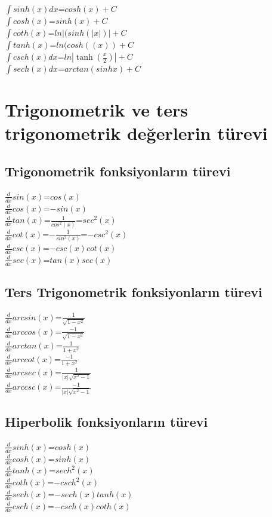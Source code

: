 \documentclass[10pt]{article}
\begin{document}
$\displaystyle \int sinh(x)dx$=$cosh(x)+C$\\
$\displaystyle \int cosh(x)$=$sinh(x)+C$\\
$\displaystyle \int coth(x)$=$ln|(sinh(|x|)|+C$\\
$\displaystyle \int tanh(x)$=$ln(cosh((x))+C$\\
$\displaystyle \int csch(x)dx$=$ln| \tanh(\frac{x}{2}) |+C$\\
$\displaystyle \int sech(x)dx$=$arctan(sinhx)+C$\\





\section {Trigonometrik ve ters trigonometrik değerlerin türevi}
\subsection*{Trigonometrik fonksiyonların türevi}
$\frac{d}{dx}sin(x)$=$cos(x)$\\
$\frac{d}{dx}cos(x)$=$-sin(x)$\\
$\frac{d}{dx}tan(x)$=$\frac{1}{cos^2(x)}$=$sec^2(x)$\\
$\frac{d}{dx}cot(x)$=$-\frac{1}{sin^2(x)}$=$-csc^2(x)$\\
$\frac{d}{dx}csc(x)$=$-csc(x)cot(x)$\\
$\frac{d}{dx}sec(x)$=$tan(x)sec(x)$\\

\subsection*{Ters Trigonometrik fonksiyonların türevi}
$\frac{d}{dx}arcsin(x)$=$\frac{1}{\sqrt{1-x^2}}$\\
$\frac{d}{dx}arccos(x)$=$\frac{-1}{\sqrt{1-x^2}}$\\
$\frac{d}{dx}arctan(x)$=$\frac{1}{1+x^2}$\\
$\frac{d}{dx}arccot(x)$=$\frac{-1}{1+x^2}$\\
$\frac{d}{dx}arcsec(x)$=$\frac{1}{|x|\sqrt{x^2-1}}$\\
$\frac{d}{dx}arccsc(x)$=$\frac{-1}{|x|\sqrt{x^2-1}}$\\

\subsection*{Hiperbolik fonksiyonların türevi}
$\frac{d}{dx}sinh(x)$=$cosh(x)$\\
$\frac{d}{dx}cosh(x)$=$sinh(x)$\\
$\frac{d}{dx}tanh(x)$=$sech^2(x)$\\
$\frac{d}{dx}coth(x)$=$-csch^2(x)$\\
$\frac{d}{dx}sech(x)$=$-sech(x)tanh(x)$\\
$\frac{d}{dx}csch(x)$=$-csch(x)coth(x)$\\
\end{document}
